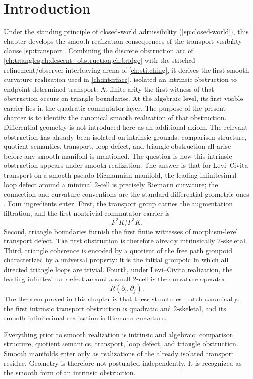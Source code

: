 \section{Introduction}
Under the standing principle of closed-world admissibility
(\cref{sp:closed-world}), this chapter develops the smooth-realization
consequences of the transport-visibility clause \cref{sp:transport}.
Combining the discrete obstruction arc of
\cref{ch:triangles,ch:descent_obstruction,ch:bridge} with the stitched
refinement/observer interleaving arena of \cref{ch:stitching}, it
derives the first smooth curvature realization used in
\cref{ch:interface}.
 isolated an
intrinsic obstruction to
endpoint-determined transport.  At finite arity the first witness of
that obstruction occurs on triangle boundaries.  At the algebraic
level, its first visible carrier lies in the quadratic commutator
layer.  The purpose of the present chapter is to identify the canonical smooth
realization of that obstruction.
Differential geometry is not introduced here as an additional axiom.
The relevant obstruction has already been isolated on intrinsic
grounds: comparison structure, quotient semantics, transport, loop
defect, and triangle obstruction all arise before any smooth manifold
is mentioned.  The question is how this intrinsic obstruction appears
under smooth realization.
The answer is that for Levi--Civita transport on a smooth
pseudo-Riemannian manifold, the leading infinitesimal loop defect
around a minimal \(2\)-cell is precisely Riemann curvature; the
connection and curvature conventions are the standard differential
geometric ones \cite{KobayashiNomizu1963,Wald1984}.
Four ingredients enter.
First, the transport group carries the augmentation filtration, and the
first nontrivial commutator carrier is
\[
	F^2K/F^3K.
\]
Second, triangle boundaries furnish the first finite witnesses of
morphism-level transport defect.  The first obstruction is therefore
already intrinsically \(2\)-skeletal.
Third, triangle coherence is encoded by a quotient of the free path
groupoid characterized by a universal property: it is the initial
groupoid in which all directed triangle loops are trivial.
Fourth, under Levi--Civita realization, the leading infinitesimal
defect around a small \(2\)-cell is the curvature operator
\[
	R(\partial_i,\partial_j).
\]
The theorem proved in this chapter is that these structures match
canonically: the first intrinsic transport obstruction is quadratic and
\(2\)-skeletal, and its smooth infinitesimal realization is Riemann
curvature.
\begin{remark}
	Everything prior to smooth realization is intrinsic and algebraic:
	comparison structure, quotient semantics, transport, loop defect, and
	triangle obstruction.  Smooth manifolds enter only as realizations of
	the already isolated transport residue.  Geometry is therefore not
	postulated independently.  It is recognized as the smooth form of an
	intrinsic obstruction.
\end{remark}
